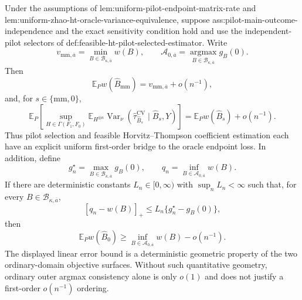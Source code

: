 Under the assumptions of lem:uniform-pilot-endpoint-matrix-rate and lem:uniform-zhao-ht-oracle-variance-equivalence, suppose ass:pilot-main-outcome-independence and the exact sensitivity condition hold and use the independent-pilot selectors of def:feasible-ht-pilot-selected-estimator.  Write
\[
v_{\mathrm{mm},\overline a}=\min_{B\in\mathcal B_{\kappa,\overline a}}w(B),
\qquad
\mathcal A_{0,\overline a}=\operatorname*{argmax}_{B\in\mathcal B_{\kappa,\overline a}}g_B(0).
\]
Then
\[
\mathbb E_P w(\widehat B_{\mathrm{mm}})
=v_{\mathrm{mm},\overline a}+o(n^{-1}),
\]
and, for \(s\in\{\mathrm{mm},0\}\),
\[
\mathbb E_P\left[
\sup_{H\in\Gamma(F_1,F_0)}
\mathbb E_{H^{\otimes n}}
\operatorname{Var}_\nu
(\widehat\tau_{\widehat B_s}^{\mathrm{CV}}\mid\widehat B_s,Y)
\right]
=\mathbb E_Pw(\widehat B_s)+o(n^{-1}).
\]
Thus pilot selection and feasible Horvitz--Thompson coefficient estimation each have an explicit uniform first-order bridge to the oracle endpoint loss.  In addition, define
\[
g_n^\star=\max_{B\in\mathcal B_{\kappa,\overline a}}g_B(0),
\qquad
q_n=\inf_{B\in\mathcal A_{0,\overline a}}w(B).
\]
If there are deterministic constants \(L_n\in[0,\infty)\) with \(\sup_nL_n<\infty\) such that, for every \(B\in\mathcal B_{\kappa,\overline a}\),
\[
[q_n-w(B)]_+\le L_n\{g_n^\star-g_B(0)\},
\]
then
\[
\mathbb E_Pw(\widehat B_0)
\ge\inf_{B\in\mathcal A_{0,\overline a}}w(B)-o(n^{-1}).
\]
The displayed linear error bound is a deterministic geometric property of the two ordinary-domain objective surfaces.  Without such quantitative geometry, ordinary outer argmax consistency alone is only \(o(1)\) and does not justify a first-order \(o(n^{-1})\) ordering.